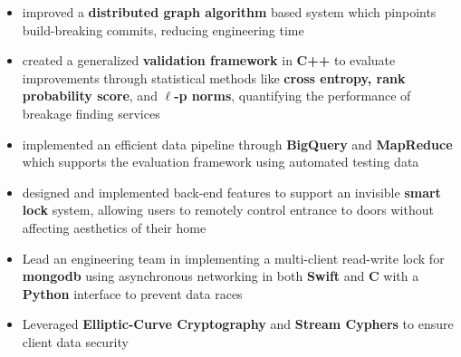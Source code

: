 \documentclass[10pt,a4paper,ragged2e]{altacv}
\begin{document}

\begin{fullwidth}
    \makecvheader
\end{fullwidth}




\begin{itemize}
    \item improved a \textbf{distributed graph algorithm} based system which pinpoints build-breaking commits,
      reducing engineering time
    \item created a generalized \textbf{validation framework} in \textbf{C++} to evaluate improvements
      through statistical methods like \textbf{cross entropy, rank probability score}, and \textbf{$\ell$-p norms},
      quantifying the performance of breakage finding services
    \item implemented an efficient data pipeline through \textbf{BigQuery} and \textbf{MapReduce}
      which supports the evaluation framework using automated testing data
\end{itemize}

\divider

\begin{itemize}
    \item designed and implemented back-end features to support an invisible \textbf{smart lock} system,
        allowing users to remotely control entrance to doors without affecting aesthetics of their home
    \item Lead an engineering team in implementing a multi-client read-write lock for \textbf{mongodb} using asynchronous networking in both \textbf{Swift} and \textbf{C} with a \textbf{Python} interface to prevent data races
    \item Leveraged \textbf{Elliptic-Curve Cryptography} and \textbf{Stream Cyphers} to ensure client data security
\end{itemize}
\end{document}
